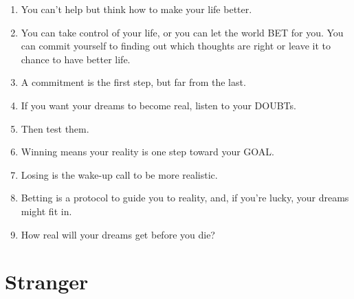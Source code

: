 \documentclass[
]{book}
\providecommand{\tightlist}{%
  \setlength{\itemsep}{0pt}\setlength{\parskip}{0pt}}
\begin{document}
\begin{enumerate}
\def\labelenumi{\arabic{enumi}.}
\tightlist
\item
  You can't help but think how to make your life better.
\item
  You can take control of your life, or you can let the world BET for you.
  You can commit yourself to finding out which thoughts are right or
  leave it to chance to have better life.
\item
  A commitment is the first step, but far from the last.
\item
  If you want your dreams to become real, listen to your DOUBTs.
\item
  Then test them.
\item
  Winning means your reality is one step toward your GOAL.
\item
  Losing is the wake-up call to be more realistic.
\item
  Betting is a protocol to guide you to reality, and, if you're lucky, your
  dreams might fit in.
\item
  How real will your dreams get before you die?
\end{enumerate}

\hypertarget{stranger}{%
\section{Stranger}\label{stranger}}
\end{document}
